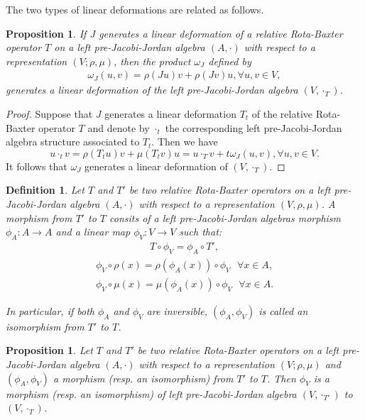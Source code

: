 \documentclass[12pt]{amsart}
\newtheorem{definition}[Theorem]{Definition}
\newtheorem{proposition}[Theorem]{Proposition}
\begin{document}
The two types of linear deformations are related as follows.
\begin{proposition}\label{Pro9}
	If $ J $ generates a linear deformation of a relative Rota-Baxter operator $ T $ on a left pre-Jacobi-Jordan algebra $ (A,\cdot) $ with respect to a representation $(V; \rho,\mu) $, then the product $ \omega_{J} $  defined by
	\begin{eqnarray}
		\label{26}
		\omega_{J}(u,v)=\rho(Ju)v+\rho(Jv)u, \forall u,v\in V,
	\end{eqnarray}
	generates a linear deformation of the left pre-Jacobi-Jordan algebra $ (V,\cdot_{T}) $.  	
\end{proposition}
\begin{proof}
	Suppose that $J$ generates a linear deformation $T_t$ of the relative Rota-Baxter operator $T$  and denote by $ \cdot_{t} $ the corresponding left pre-Jacobi-Jordan algebra structure associated to $T_{t} $. Then we have
	$$
	u\cdot_{t}v=\rho(T_{t}u)v+\mu(T_{t}v)u=u\cdot_{T}v+t\omega_{J}(u,v),\forall u,v\in V.$$
	It follows that $\omega_{J} $ generates a linear deformation of $ (V,\cdot_{T}) $. 
\end{proof}
\begin{definition}\label{D9}
	Let $ T $ and $ T' $ be two relative Rota-Baxter operators on a left pre-Jacobi-Jordan algebra $ (A,\cdot) $ with respect to a representation $ (V, \rho,\mu) $. A morphism from $ T' $ to $ T $ consits of a left pre-Jacobi-Jordan algebras morphism $\phi_{A} : A\to A $ and a linear map $ \phi_{V} : V\to V $ such that:   
	\begin{eqnarray}
		\label{36}
		T \circ \phi_{V}=\phi_{A}\circ T',
	\end{eqnarray}
	\begin{eqnarray}
		\label{37}
		\phi_{V}\circ\rho(x)=\rho(\phi_{A}(x))\circ\phi_{V} \mbox{ $\forall x\in A$},
	\end{eqnarray}
	\begin{eqnarray}
		\label{38}
		\phi_{V}\circ\mu(x)=\mu(\phi_{A}(x))\circ\phi_{V} \mbox{ $\forall x\in A.$}
	\end{eqnarray}	
	
	In particular, if both $ \phi_A$ and $ \phi_{V}$ are inversible, $ (\phi_{A},\phi_{V}) $ is called an isomorphism from $ T' $ to $ T $.
\end{definition}
\begin{proposition}\label{Pro8}
	Let $ T $ and $ T' $ be two relative Rota-Baxter operators on a left pre-Jacobi-Jordan algebra $ (A,\cdot) $ with respect to a representation $ (V; \rho,\mu) $ and $ (\phi_{A},\phi_{V}) $ a morphism (resp. an isomorphism) from $ T' $ to $ T $. Then $ \phi_{V} $ is a morphism (resp. an isomorphism) of left pre-Jacobi-Jordan algebra $ (V,\cdot_{T'}) $ to $ (V,\cdot_{T})$.
\end{proposition}
\end{document}
